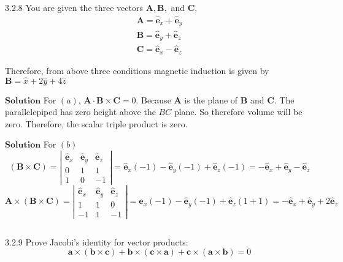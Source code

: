 \newpage


\begin{mybox}{3.2.8}
You are given the three vectors $\mathbf{A}, \mathbf{B},$ and $\mathbf{C},$
$$
\begin{array}{l}{\mathbf{A}=\hat{\mathbf{e}}_{x}+\hat{\mathbf{e}}_{y}} \\ {\mathbf{B}=\hat{\mathbf{e}}_{y}+\hat{\mathbf{e}}_{z}} \\ {\mathbf{C}=\hat{\mathbf{e}}_{x}-\hat{\mathbf{e}}_{z}}\end{array}
$$

Therefore, from above three conditions magnetic induction is given by $ \mathbf{B} = \hat { x } + 2 \hat { y } + 4 \hat { z }$
\end{mybox}


$\boxed{\textbf{Solution}}$ For $(a)$, $\mathbf{A} \cdot \mathbf{B} \times \mathbf{C}=0 .$ Because $\mathbf{A}$ is the plane of $\mathbf{B}$ and $\mathbf{C}$. The parallelepiped has zero height above the $BC$ plane. So therefore volume will be zero.
Therefore, the scalar triple product is zero.




$\boxed{\textbf{Solution}}$ For $(b)$ 
$$
(\mathbf{B} \times \mathbf{C})=\left|\begin{array}{ccc}
\hat{\mathbf{e}}_{x} & \hat{\mathbf{e}}_{y} & \hat{\mathbf{e}}_{z} \\
0 & 1 & 1 \\
1 & 0 & -1
\end{array}\right|=\hat{\mathbf{e}}_{x}(-1)-\hat{\mathbf{e}}_{y}(-1)+\hat{\mathbf{e}}_{z}(-1)=-\hat{\mathbf{e}}_{x}+\hat{\mathbf{e}}_{y}-\hat{\mathbf{e}}_{z}
$$
$$
\mathbf{A} \times(\mathbf{B} \times \mathbf{C})=\left|\begin{array}{ccc}
\hat{\mathbf{e}}_{x} & \hat{\mathbf{e}}_{y} & \hat{\mathbf{e}}_{z} \\
1 & 1 & 0 \\
-1 & 1 & -1
\end{array}\right|=\hat{\mathbf{e}}_{x}(-1)-\hat{\mathbf{e}}_{y}(-1)+\hat{\mathbf{e}}_{z}(1+1)=-\hat{\mathbf{e}}_{x}+\hat{\mathbf{e}}_{y}+2 \hat{\mathbf{e}}_{z}
$$


$$$$

\begin{mybox}{3.2.9}
Prove Jacobi's identity for vector products:
$$
\mathbf{a} \times(\mathbf{b} \times \mathbf{c})+\mathbf{b} \times(\mathbf{c} \times \mathbf{a})+\mathbf{c} \times(\mathbf{a} \times \mathbf{b})=0
$$
\end{mybox}


